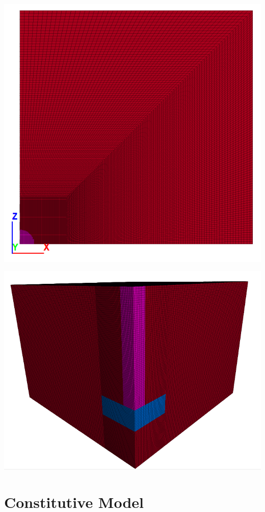 \documentclass[a4paper, nobind]{templates/ociamthesis}
\begin{document}
\includegraphics[width=1\linewidth]{myfigureeeeee/e}

\includegraphics[width=1\linewidth]{myfigureeeeee/f}

\hypertarget{constitutive-model}{%
\section{Constitutive Model}\label{constitutive-model}}
\end{document}
